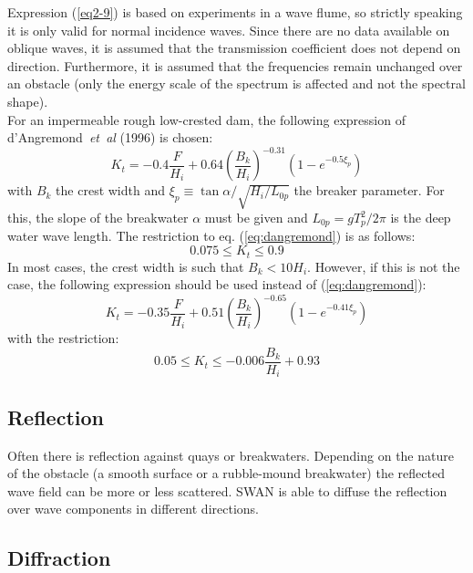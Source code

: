 \documentclass[12pt]{book}
\begin{document}
Expression (\ref{eq2-9}) is based on experiments in a wave flume, so strictly speaking it is only valid for
normal incidence waves. Since there are no data available on oblique waves, it is assumed that the
transmission coefficient does not depend on direction. Furthermore, it is assumed that the frequencies remain
unchanged over an obstacle (only the energy scale of the spectrum is affected and not the spectral shape).
\\[2ex]
\noindent
For an impermeable rough low-crested dam, the following expression of d'Angremond~{\it et~al} (1996) is chosen:
\begin{equation}
  K_t = -0.4 \frac{F}{H_i} + 0.64 (\frac{B_k}{H_i})^{-0.31} (1 - e^{-0.5{\xi}_p})
  \label{eq:dangremond}
\end{equation}
with $B_k$ the crest width and ${\xi}_p \equiv \tan \alpha/\sqrt{H_i/L_{0p}}$ the breaker parameter. For this,
the slope of the breakwater $\alpha$ must be given and $L_{0p} = g T_p^2/ 2\pi$ is the deep water wave length.
The restriction to eq. (\ref{eq:dangremond}) is as follows:
\begin{equation}
  0.075 \leq K_t \leq 0.9
\end{equation}
In most cases, the crest width is such that $B_k < 10 H_i$. However, if this is not the case, the following expression
should be used instead of (\ref{eq:dangremond}):
\begin{equation}
  K_t = -0.35 \frac{F}{H_i} + 0.51 (\frac{B_k}{H_i})^{-0.65} (1 - e^{-0.41{\xi}_p})
  \label{eq:dangremond2}
\end{equation}
with the restriction:
\begin{equation}
  0.05 \leq K_t \leq -0.006\frac{B_k}{H_i} + 0.93
\end{equation}
\nocite{God67TM,See79,Dan96MJ}

\subsection{Reflection}

Often there is reflection against quays or breakwaters.
Depending on the nature of the obstacle (a smooth surface or a rubble-mound breakwater)
the reflected wave field can be more or less scattered.
SWAN is able to diffuse the reflection over wave components in different directions.

\subsection{Diffraction} \label{sec:diffrac}
\end{document}
